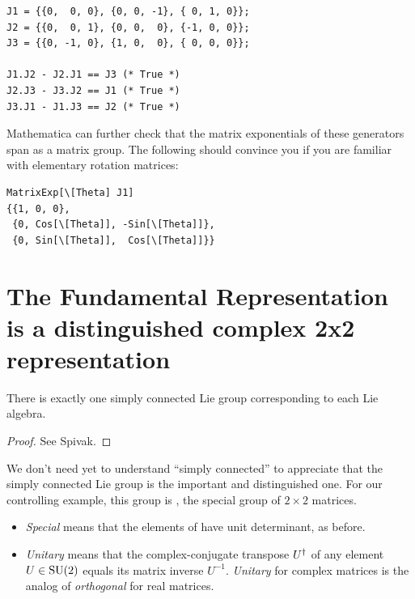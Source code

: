 \begin{Verbatim}[frame=single, label=Mathematica]
J1 = {{0,  0, 0}, {0, 0, -1}, { 0, 1, 0}};
J2 = {{0,  0, 1}, {0, 0,  0}, {-1, 0, 0}};
J3 = {{0, -1, 0}, {1, 0,  0}, { 0, 0, 0}};

J1.J2 - J2.J1 == J3 (* True *)
J2.J3 - J3.J2 == J1 (* True *)
J3.J1 - J1.J3 == J2 (* True *)
\end{Verbatim}

\noindent Mathematica can further check that the matrix exponentials of these
generators span  as a matrix group. The following should convince you
if you are familiar with elementary rotation matrices:

\begin{Verbatim}[frame=single, label=Mathematica]
MatrixExp[\[Theta] J1]
{{1, 0, 0}, 
 {0, Cos[\[Theta]], -Sin[\[Theta]]}, 
 {0, Sin[\[Theta]],  Cos[\[Theta]]}}
\end{Verbatim}

\section{The Fundamental Representation is a distinguished complex 2x2 representation}

\begin{fact}
There is exactly one simply connected Lie group corresponding to each Lie algebra.
\end{fact}

\begin{proof}
    See Spivak.\cite{spivak1999}
\end{proof}

\noindent We don't need yet to understand ``simply connected'' to
appreciate that the simply connected Lie group is the important and
distinguished one. For our controlling example, this group is , 
the special  group of $2\times{}2$ matrices.

\begin{remark}\leavevmode
    \begin{itemize}
        \item \textit{Special} means that the elements of  have unit determinant, as before.
        \item \textit{Unitary} means that the complex-conjugate transpose $U^\dagger$ of any
            element $U\in\mathrm{SU}(2)$ equals its matrix inverse $U^{-1}$. \textit{Unitary} for complex 
            matrices is the analog of \textit{orthogonal} for real matrices.
    \end{itemize}
\end{remark}

